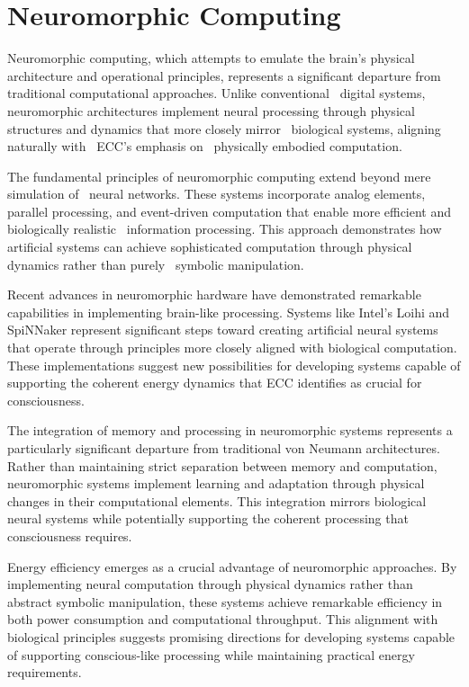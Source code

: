 \section{Neuromorphic Computing}

 Neuromorphic computing, which attempts to emulate the brain's physical architecture and operational principles, represents a significant departure from traditional computational approaches. Unlike conventional~ digital systems, neuromorphic architectures implement neural processing through physical structures and dynamics that more closely mirror~ biological systems, aligning naturally with~ ECC's emphasis on~ physically embodied computation.

The fundamental principles of neuromorphic computing extend beyond mere simulation of~ neural networks. These systems incorporate analog elements, parallel processing, and event-driven computation that enable more efficient and biologically realistic~ information processing. This approach demonstrates how artificial systems can achieve sophisticated computation through physical dynamics rather than purely~ symbolic manipulation.

Recent advances in neuromorphic hardware have demonstrated remarkable capabilities in implementing brain-like processing. Systems like Intel's Loihi and SpiNNaker represent significant steps toward creating artificial neural systems that operate through principles more closely aligned with biological computation. These implementations suggest new possibilities for developing systems capable of supporting the coherent energy dynamics that ECC identifies as crucial for~ consciousness.

The integration of memory and processing in neuromorphic systems represents a particularly significant departure from traditional von Neumann architectures. Rather than maintaining strict separation between memory and computation, neuromorphic systems implement learning and adaptation through physical changes in their computational elements. This integration mirrors biological neural systems while potentially supporting the coherent processing that consciousness requires.

 Energy efficiency emerges as a crucial advantage of neuromorphic approaches. By implementing neural computation through physical dynamics rather than abstract symbolic manipulation, these systems achieve remarkable efficiency in both power consumption and computational throughput. This alignment with biological principles suggests promising directions for developing systems capable of supporting conscious-like processing while maintaining practical energy requirements.

